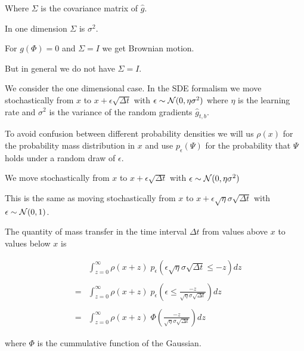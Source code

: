 {\vfill
Where $\Sigma$ is the covariance matrix of $\hat{g}$.

\vfill
In one dimension $\Sigma$ is $\sigma^2$.

\vfill
For $g(\Phi) = 0$ and $\Sigma = I$ we get Brownian motion.

\vfill
But in general we do not have $\Sigma = I$.






{\Large
We consider the one dimensional case. In the SDE formalism we move stochastically from $x$ to $x + \epsilon \sqrt{\Delta t}$ with $\epsilon \sim {\cal N}(0,\eta\sigma^2)$
where $\eta$ is the learning rate and $\sigma^2$ is the variance of the random gradients $\hat{g}_{t,b}$.

\vfill
To avoid confusion between different probability densities we will us $\rho(x)$ for the probability mass distribution in $x$ and use $p_\epsilon(\Psi)$
for the probability that $\Psi$ holds under a random draw of $\epsilon$.

}

{\Large

We move stochastically from $x$ to $x + \epsilon \sqrt{\Delta t}$ with $\epsilon \sim {\cal N}(0,\eta\sigma^2)$

\vfill
This is the same as moving stochastically from $x$ to $x + \epsilon\sqrt{\eta}\sigma\sqrt{\Delta t}$ with $\epsilon \sim {\cal N}(0,1)$.

\vfill
The quantity of mass transfer in the time interval $\Delta t$ from values above $x$ to values below $x$ is


\begin{eqnarray*}
& & \int_{z = 0}^\infty  \rho(x + z)\;p_\epsilon(\epsilon\sqrt{\eta}\sigma\sqrt{\Delta t} \leq -z) dz  \\
\\
& = & \int_{z = 0}^\infty  \rho(x + z)\;p_\epsilon\left(\epsilon \leq \frac{-z}{\sqrt{\eta}\sigma\sqrt{\Delta t}}\right) dz  \\
\\
& =  & \int_{z = 0}^\infty \rho(x+z)\;\Phi\left(\frac{-z}{\sqrt{\eta}\sigma\sqrt{\Delta t}}\right) dz
\end{eqnarray*}

\vfill
where $\Phi$ is the cummulative function of the Gaussian.
}

{\Large

}}
